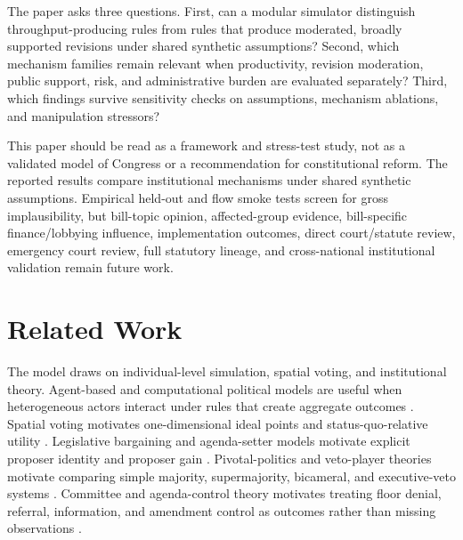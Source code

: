 \documentclass[manuscript]{acmart}
\begin{document}
The paper asks three questions. First, can a modular simulator distinguish throughput-producing rules from rules that produce moderated, broadly supported revisions under shared synthetic assumptions? Second, which mechanism families remain relevant when productivity, revision moderation, public support, risk, and administrative burden are evaluated separately? Third, which findings survive sensitivity checks on assumptions, mechanism ablations, and manipulation stressors?

This paper should be read as a framework and stress-test study, not as a validated model of Congress or a recommendation for constitutional reform. The reported results compare institutional mechanisms under shared synthetic assumptions. Empirical held-out and flow smoke tests screen for gross implausibility, but bill-topic opinion, affected-group evidence, bill-specific finance/lobbying influence, implementation outcomes, direct court/statute review, emergency court review, full statutory lineage, and cross-national institutional validation remain future work.

\section{Related Work}

The model draws on individual-level simulation, spatial voting, and institutional theory. Agent-based and computational political models are useful when heterogeneous actors interact under rules that create aggregate outcomes \citep{Epstein2006,GilbertTroitzsch2005,deMarchiPage2014}. Spatial voting motivates one-dimensional ideal points and status-quo-relative utility \citep{Downs1957}. Legislative bargaining and agenda-setter models motivate explicit proposer identity and proposer gain \citep{BaronFerejohn1989,RomerRosenthal1978}. Pivotal-politics and veto-player theories motivate comparing simple majority, supermajority, bicameral, and executive-veto systems \citep{Krehbiel1998,Tsebelis2002}. Committee and agenda-control theory motivates treating floor denial, referral, information, and amendment control as outcomes rather than missing observations \citep{CoxMcCubbins2005,GilliganKrehbiel1987,Krehbiel1991,Shepsle1979,ShepsleWeingast1987,WeingastMarshall1988}.
\end{document}
